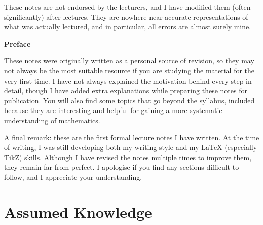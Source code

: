 \documentclass{article}
\theoremstyle{plain}\theoremheaderfont{\normalfont\itshape}\theorembodyfont{\rmfamily}\theoremseparator{.}\newtheorem*{rem}{Remark}\newtheorem*{ex}{Example}\newtheorem*{proof}{Proof}\newtheorem*{altp}{Alternative proof}
\theoremstyle{plain}\theoremheaderfont{\normalfont\bfseries}\theorembodyfont{\rmfamily}\theoremseparator{.}\newtheorem{thm}{Theorem}[section]\newtheorem{lem}[thm]{Lemma}\newtheorem{prop}[thm]{Proposition}\newtheorem*{cor}{Corollary}\newtheorem{defn}[thm]{Definition}\newtheorem{clm}[thm]{Claim}\newtheorem{clminproof}{Claim}
\theoremstyle{break}\theoremheaderfont{\normalfont\itshape}\theorembodyfont{\rmfamily}\theoremseparator{.\medskip}\newtheorem*{proofskip}{Proof}\newtheorem*{exs}{Examples}\newtheorem*{rems}{Remarks}
\theoremstyle{break}\theoremheaderfont{\normalfont\bfseries}\theorembodyfont{\rmfamily}\theoremseparator{.\medskip}\newtheorem{lemskip}[thm]{Lemma}\newtheorem{defnskip}[thm]{Definition}\newtheorem{propskip}[thm]{Proposition}\newtheorem{thmskip}[thm]{Theorem}
\numberwithin{equation}{section}
\begin{document}
	These notes are not endorsed by the lecturers, and I have modified them (often
	significantly) after lectures. They are nowhere near accurate representations of what was actually lectured, and in particular, all errors are almost surely mine.

	\vskip 30pt

    \begin{center}
		\textbf{\Large{Preface}}
	\end{center}
	These notes were originally written as a personal source of revision, so they may not always be the most suitable resource if you are studying the material for the very first time. I have not always explained the motivation behind every step in detail, though I have added extra explanations while preparing these notes for publication. You will also find some topics that go beyond the syllabus, included because they are interesting and helpful for gaining a more systematic understanding of mathematics.

	A final remark: these are the first formal lecture notes I have written. At the time of writing, I was still developing both my writing style and my {\LaTeX} (especially TikZ) skills. Although I have revised the notes multiple times to improve them, they remain far from perfect. I apologise if you find any sections difficult to follow, and I appreciate your understanding.
	
	\normalsize
	\newpage
	\tableofcontents
	\newpage

	\section{Assumed Knowledge}
\end{document}
